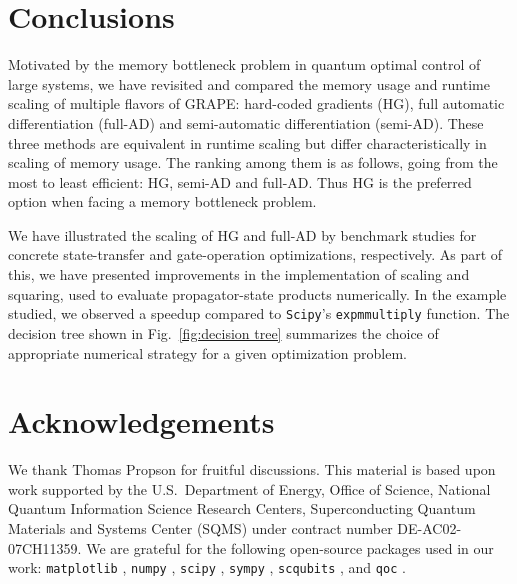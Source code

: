 \section{Conclusions \label{Conclusions}}

Motivated by the memory bottleneck problem in quantum optimal control of large systems, we have revisited and compared the memory usage and runtime scaling of multiple flavors of GRAPE: hard-coded gradients (HG), full automatic differentiation (full-AD) and semi-automatic differentiation (semi-AD). These three methods are equivalent in runtime scaling but differ characteristically in scaling of memory usage. The ranking among them is as follows, going from the most to least efficient: HG, semi-AD and full-AD. Thus HG is the preferred option when facing a memory bottleneck problem. 

We have illustrated the scaling of HG and full-AD by benchmark studies for concrete state-transfer and gate-operation optimizations, respectively. As part of this, we have presented improvements in the implementation of scaling and squaring, used to evaluate propagator-state products numerically. In the example studied, we observed a speedup compared to \texttt{Scipy}'s \texttt{expm\textunderscore multiply} function. The decision tree shown in Fig.\ \ref{fig:decision tree} summarizes the choice of appropriate numerical strategy for a given optimization problem.

\section*{Acknowledgements}
We thank Thomas Propson for fruitful discussions. This material is based upon work supported by the U.S.\  Department of Energy, Office of Science, National Quantum Information Science Research Centers, Superconducting Quantum Materials and Systems Center (SQMS) under contract number DE-AC02-07CH11359. We are grateful for the following open-source packages used in our work: \texttt{matplotlib} \cite{hunter2007matplotlib}, \texttt{numpy} \cite{harris2020array}, \texttt{scipy}  \cite{virtanen2020scipy}, \texttt{sympy}  \cite{meurer2017sympy}, \texttt{scqubits} \cite{groszkowski2021scqubits}, and 
 \texttt{qoc}  \cite{pacqoc}.


